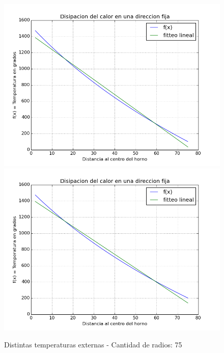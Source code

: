 \begin{figure}[h]
\centering
\includegraphics[scale=0.34]{funcion_temp_75_radios_ti_1500_te_102.png}
\includegraphics[scale=0.34]{funcion_temp_75_radios_ti_1500_te_202.png}
\caption{Distintas temperaturas externas - Cantidad de radios: 75}
\end{figure}

